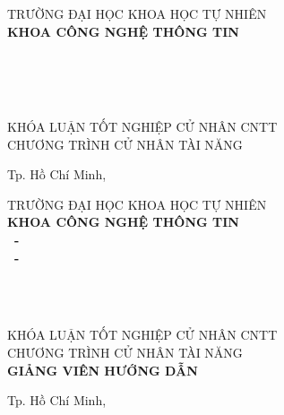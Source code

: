 \begin{titlepage}

\begin{center}

TRƯỜNG ĐẠI HỌC KHOA HỌC TỰ NHIÊN\\
\textbf{KHOA CÔNG NGHỆ THÔNG TIN}\\[2cm]

{\Large \bfseries \tenSV\\[2cm]}

{\Large \bfseries \tenKLdongmot\\\tenKLdonghai\\[3cm]}

\large KHÓA LUẬN TỐT NGHIỆP CỬ NHÂN CNTT\\
\large CHƯƠNG TRÌNH CỬ NHÂN TÀI NĂNG\\


\vfill
Tp. Hồ Chí Minh, \thangNam

\end{center}

\pagebreak

\begin{center}

TRƯỜNG ĐẠI HỌC KHOA HỌC TỰ NHIÊN\\
\textbf{KHOA CÔNG NGHỆ THÔNG TIN}\\[2cm]

{\large \bfseries \tenSVMot~-~\mssvMot\\}
{\large \bfseries \tenSVHai~-~\mssvHai\\[2cm]}

{\Large \bfseries \tenKLdongmot\\\tenKLdonghai\\[2cm]}

\large KHÓA LUẬN TỐT NGHIỆP CỬ NHÂN CNTT\\
\large CHƯƠNG TRÌNH CỬ NHÂN TÀI NĂNG\\[2cm]

\textbf{GIẢNG VIÊN HƯỚNG DẪN}\\
\tenGVHD


\vfill
Tp. Hồ Chí Minh, \thangNam

\end{center}


\end{titlepage}